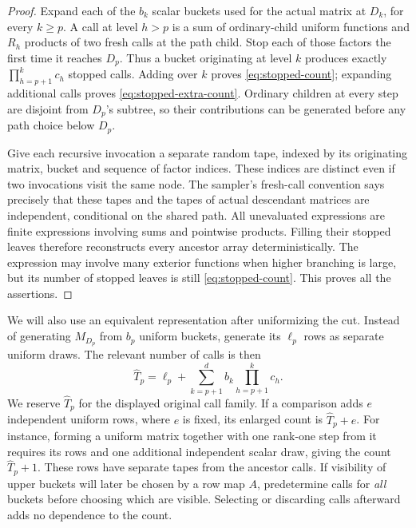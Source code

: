\begin{proof}
Expand each of the $b_k$ scalar buckets used for the actual matrix at $D_k$,
for every $k\ge p$.  A call at level $h>p$ is a sum of ordinary-child uniform
functions and $R_h$ products of two fresh calls at the path child.  Stop each
of those factors the first time it reaches $D_p$.  Thus a bucket originating
at level $k$ produces exactly $\prod_{h=p+1}^k c_h$ stopped calls.  Adding over
$k$ proves \eqref{eq:stopped-count}; expanding additional calls proves
\eqref{eq:stopped-extra-count}.  Ordinary children at every step are disjoint
from $D_p$'s subtree, so their contributions can be generated before any path
choice below $D_p$.

Give each recursive invocation a separate random tape, indexed by its
originating matrix, bucket and sequence of factor indices.  These indices
are distinct even if two invocations visit the same node.  The sampler's
fresh-call convention says precisely that these tapes and the tapes of
actual descendant matrices are independent, conditional on the shared path.
All unevaluated expressions are finite expressions involving sums and
pointwise products.  Filling their stopped leaves therefore reconstructs
every ancestor array deterministically.  The expression may involve many
exterior functions when higher branching is large, but its number of stopped
leaves is still \eqref{eq:stopped-count}.  This proves all the assertions.
\end{proof}

We will also use an equivalent representation after uniformizing the cut.
Instead of generating $M_{D_p}$ from $b_p$ uniform buckets, generate its
$\ell_p$ rows as separate uniform draws.  The relevant number of calls is then
\begin{equation}\label{eq:direct-cut-count}
 \widehat T_p=\ell_p+
     \sum_{k=p+1}^d b_k\prod_{h=p+1}^k c_h.
\end{equation}
We reserve $\widehat T_p$ for the displayed original call family.  If a
comparison adds $e$ independent uniform rows, where $e$ is fixed, its
enlarged count is $\widehat T_p+e$.  For instance, forming a uniform matrix
together with one rank-one step from it requires its rows and one additional
independent scalar draw, giving the count $\widehat T_p+1$.
These rows have separate tapes from the ancestor calls.  If visibility of
upper buckets will later be chosen by a row map $A$, predetermine calls for
\emph{all} buckets before choosing which are visible.  Selecting or discarding
calls afterward adds no dependence to the count.

